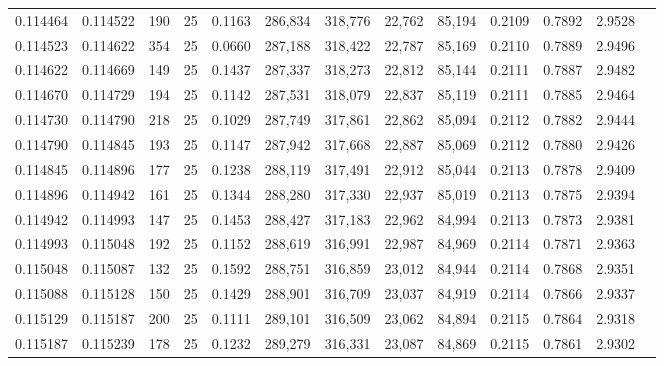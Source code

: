 \begin{tabular}{rrrrrrrrrrrrr}
0.114464 & 0.114522 &   190 &  25 &                                     0.1163 & 286,834 & 318,776 &  22,762 &  85,194 & 0.2109 & 0.7892 & 2.9528 \\
0.114523 & 0.114622 &   354 &  25 &                                     0.0660 & 287,188 & 318,422 &  22,787 &  85,169 & 0.2110 & 0.7889 & 2.9496 \\
0.114622 & 0.114669 &   149 &  25 &                                     0.1437 & 287,337 & 318,273 &  22,812 &  85,144 & 0.2111 & 0.7887 & 2.9482 \\
0.114670 & 0.114729 &   194 &  25 &                                     0.1142 & 287,531 & 318,079 &  22,837 &  85,119 & 0.2111 & 0.7885 & 2.9464 \\
0.114730 & 0.114790 &   218 &  25 &                                     0.1029 & 287,749 & 317,861 &  22,862 &  85,094 & 0.2112 & 0.7882 & 2.9444 \\
0.114790 & 0.114845 &   193 &  25 &                                     0.1147 & 287,942 & 317,668 &  22,887 &  85,069 & 0.2112 & 0.7880 & 2.9426 \\
0.114845 & 0.114896 &   177 &  25 &                                     0.1238 & 288,119 & 317,491 &  22,912 &  85,044 & 0.2113 & 0.7878 & 2.9409 \\
0.114896 & 0.114942 &   161 &  25 &                                     0.1344 & 288,280 & 317,330 &  22,937 &  85,019 & 0.2113 & 0.7875 & 2.9394 \\
0.114942 & 0.114993 &   147 &  25 &                                     0.1453 & 288,427 & 317,183 &  22,962 &  84,994 & 0.2113 & 0.7873 & 2.9381 \\
0.114993 & 0.115048 &   192 &  25 &                                     0.1152 & 288,619 & 316,991 &  22,987 &  84,969 & 0.2114 & 0.7871 & 2.9363 \\
0.115048 & 0.115087 &   132 &  25 &                                     0.1592 & 288,751 & 316,859 &  23,012 &  84,944 & 0.2114 & 0.7868 & 2.9351 \\
0.115088 & 0.115128 &   150 &  25 &                                     0.1429 & 288,901 & 316,709 &  23,037 &  84,919 & 0.2114 & 0.7866 & 2.9337 \\
0.115129 & 0.115187 &   200 &  25 &                                     0.1111 & 289,101 & 316,509 &  23,062 &  84,894 & 0.2115 & 0.7864 & 2.9318 \\
0.115187 & 0.115239 &   178 &  25 &                                     0.1232 & 289,279 & 316,331 &  23,087 &  84,869 & 0.2115 & 0.7861 & 2.9302 \\

\end{tabular}
